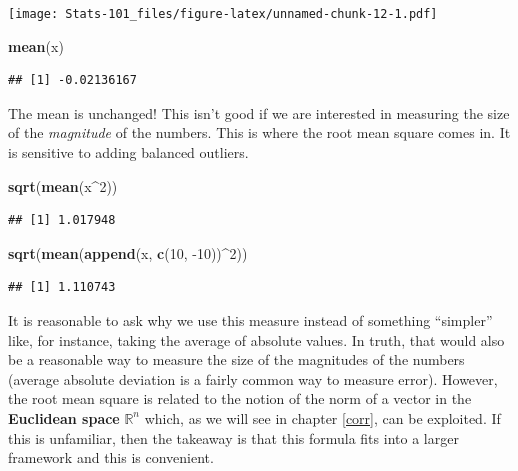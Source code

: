 \documentclass[]{book}
\newenvironment{Shaded}{\begin{snugshade}}{\end{snugshade}}
\newcommand{\DecValTok}[1]{\textcolor[rgb]{0.00,0.00,0.81}{#1}}
\newcommand{\KeywordTok}[1]{\textcolor[rgb]{0.13,0.29,0.53}{\textbf{#1}}}
\newcommand{\NormalTok}[1]{#1}
\newcommand{\OperatorTok}[1]{\textcolor[rgb]{0.81,0.36,0.00}{\textbf{#1}}}
\begin{document}
\texttt{[image: Stats-101\_files/figure-latex/unnamed-chunk-12-1.pdf]}

\begin{Shaded}
\begin{Highlighting}[]
\KeywordTok{mean}\NormalTok{(x)}
\end{Highlighting}
\end{Shaded}

\begin{verbatim}
## [1] -0.02136167
\end{verbatim}

The mean is unchanged! This isn't good if we are interested in measuring the size of the \emph{magnitude} of the numbers. This is where the root mean square comes in. It is sensitive to adding balanced outliers.

\begin{Shaded}
\begin{Highlighting}[]
\KeywordTok{sqrt}\NormalTok{(}\KeywordTok{mean}\NormalTok{(x}\OperatorTok{^}\DecValTok{2}\NormalTok{))}
\end{Highlighting}
\end{Shaded}

\begin{verbatim}
## [1] 1.017948
\end{verbatim}

\begin{Shaded}
\begin{Highlighting}[]
\KeywordTok{sqrt}\NormalTok{(}\KeywordTok{mean}\NormalTok{(}\KeywordTok{append}\NormalTok{(x, }\KeywordTok{c}\NormalTok{(}\DecValTok{10}\NormalTok{, }\DecValTok{-10}\NormalTok{))}\OperatorTok{^}\DecValTok{2}\NormalTok{))}
\end{Highlighting}
\end{Shaded}

\begin{verbatim}
## [1] 1.110743
\end{verbatim}

It is reasonable to ask why we use this measure instead of something ``simpler'' like, for instance, taking the average of absolute values. In truth, that would also be a reasonable way to measure the size of the magnitudes of the numbers (average absolute deviation is a fairly common way to measure error). However, the root mean square is related to the notion of the norm of a vector in the \textbf{Euclidean space} \(\mathbb{R}^n\) which, as we will see in chapter \ref{corr}, can be exploited. If this is unfamiliar, then the takeaway is that this formula fits into a larger framework and this is convenient.
\end{document}
